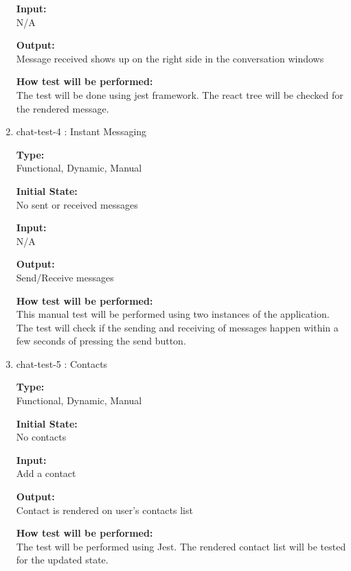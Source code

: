 \documentclass[12pt, titlepage]{article}
\begin{document}
\begin{enumerate}
\textbf{Input:}\\ N/A
					
\textbf{Output:}\\ Message received shows up on the right side in the conversation windows
					
\textbf{How test will be performed:}\\ 
The test will be done using jest framework. The react tree will be checked for the rendered message.

\item{chat-test-4 : Instant Messaging\\}

\textbf{Type:}\\ Functional, Dynamic, Manual
					
\textbf{Initial State:}\\ No sent or received messages
					
\textbf{Input:}\\ N/A
					
\textbf{Output:}\\ Send/Receive messages
					
\textbf{How test will be performed:}\\ 
This manual test will be performed using two instances of the application. The test will check if the sending and receiving of messages happen within a few seconds of pressing the send button.

\item{chat-test-5 : Contacts\\}

\textbf{Type:}\\ Functional, Dynamic, Manual
					
\textbf{Initial State:}\\ No contacts
					
\textbf{Input:}\\ Add a contact
					
\textbf{Output:}\\ Contact is rendered on user's contacts list
					
\textbf{How test will be performed:}\\ 
The test will  be performed using Jest. The rendered contact list will be tested for the updated state.
\end{enumerate}
\end{document}
